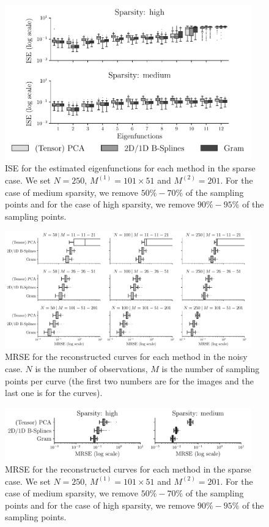 \begin{figure}
     \centering
    \includegraphics[width=0.95\textwidth]{figures/ISE_sparse}
    \caption{ISE for the estimated eigenfunctions for each method in the sparse case. We set $N = 250$, $M^{(1)} = 101 \times 51$ and $M^{(2)} = 201$. For the case of medium sparsity, we remove $50\%-70\%$ of the sampling points and for the case of high sparsity, we remove $90\%-95\%$ of the sampling points.}
    \label{fig:ise_mfd_1d_sparse}
\end{figure}


\begin{figure}
     \centering
     \includegraphics[width=0.95\textwidth]{figures/MRSE_noise}
    \caption{MRSE for the reconstructed curves for each method in the noisy case. $N$ is the number of observations, $M$ is the number of sampling points per curve (the first two numbers are for the images and the last one is for the curves).}
    \label{fig:mise_mfd_1d_noise}
\end{figure}

\begin{figure}
     \centering
     \includegraphics[width=0.95\textwidth]{figures/MRSE_sparse}
    \caption{MRSE for the reconstructed curves for each method in the sparse case. We set $N = 250$, $M^{(1)} = 101 \times 51$ and $M^{(2)} = 201$. For the case of medium sparsity, we remove $50\%-70\%$ of the sampling points and for the case of high sparsity, we remove $90\%-95\%$ of the sampling points.}
    \label{fig:mise_mfd_1d_sparse}
\end{figure}

